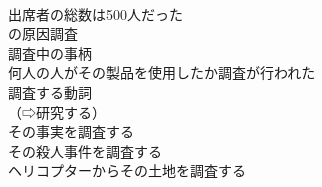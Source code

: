 \documentclass[8pt]{extreport}
\begin{document}
\begin{CJK}{UTF8}{min}
\\	出席者の総数は500人だった
\\	[(達した) 
\\	測定（する）		
\\	そくてい【測定】名詞
\\	時間の測定
\\	測定する動詞
\\	（⇨測る）
\\	対象		
\\	たいしょう【対象】
\\	【行為思考感情などの】
\\	〖非難などの〗
\\	研究の対象
\\	[(題目) 
\\	輸入（ゆにゅう）制限（せいげん）の対象となっている食品（しょくひん）
\\	彼のふるまいはしばしば非難の対象となった
\\	【目標】
\\	子供を対象とした本
\\	この歴史書は高校生を対象に書かれている
\\	調査（する）		
\\	ちょうさ【調査】名詞
\\	【質問などによる】
\\	【学術的な】
\\	（研究⇨類語）【統計測量などによる】
\\	使い分け
\\	調査検査の意を表す一般的な語
\\	公的機関などによる詳しい事実原因の調査
\\	市場調査
\\	実地調査
\\	身辺調査
\\	【身元調査】
\\	（⇨身元）
\\	実態調査
\\	（⇨実態）
\\	調査方法
\\	その事故[伝染病]の原因調査
\\	調査中の事柄
\\	何人の人がその製品を使用したか調査が行われた
\\	調査する動詞
\\	（⇨研究する）
\\	その事実を調査する
\\	その殺人事件を調査する
\\	ヘリコプターからその土地を調査する

\end{CJK}
\end{document}
